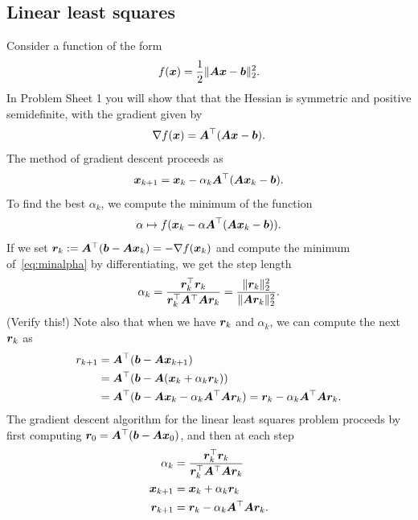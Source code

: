 \subsection{Linear least squares} Consider a function of the form
\begin{equation*}
 f(\bm{x}) = \frac{1}{2}\Vert {\bm{A}\bm{x}-\bm{b}}\Vert_2^2.
\end{equation*}
In Problem Sheet 1 you will show that that the Hessian is symmetric and positive semidefinite, with the gradient given by
\begin{equation*}
 \nabla f(\bm{x}) = \bm{A}^{\top}(\bm{A}\bm{x}-\bm{b}).
\end{equation*}
The method of gradient descent proceeds as
\begin{equation*}
 \bm{x}_{k+1} = \bm{x}_k-\alpha_k \bm{A}^{\top}(\bm{A}\bm{x}_k-\bm{b}).
\end{equation*}
To find the best $\alpha_k$, we compute the minimum of the function
\begin{equation}\label{eq:minalpha}
 \alpha \mapsto f(\bm{x}_k-\alpha \bm{A}^{\top}(\bm{A}\bm{x}_k-\bm{b})).
\end{equation}
If we set $\bm{r}_k:=\bm{A}^{\top}(\bm{b}-\bm{A}\bm{x}_k) = -\nabla f(\bm{x}_k)$ and compute the minimum of~\eqref{eq:minalpha} by differentiating, we get the step length
\begin{equation*}
 \alpha_k = \frac{\bm{r}_k^{\top}\bm{r}_k}{\bm{r}_k^{\top}\bm{A}^\top\bm{A}\bm{r}_k} = \frac{\Vert {\bm{r}_k}\Vert_2^2}{\Vert {\bm{A}\bm{r}_k}\Vert_2^2}.
\end{equation*}
(Verify this!) Note also that when we have $\bm{r}_k$ and $\alpha_k$, we can compute the next $\bm{r}_k$ as
\begin{align*}
 r_{k+1} &= \bm{A}^{\top}(\bm{b}-\bm{A}\bm{x}_{k+1})\\
         &= \bm{A}^{\top}(\bm{b}-\bm{A}(\bm{x}_{k}+\alpha_k \bm{r}_k))\\
         &= \bm{A}^{\top}(\bm{b}-\bm{A}\bm{x}_k - \alpha_k \bm{A}^{\top}\bm{A}\bm{r}_k) = \bm{r}_k - \alpha_k \bm{A}^{\top}\bm{A}\bm{r}_k.
\end{align*}
The gradient descent algorithm for the linear least squares problem proceeds by first computing $\bm{r}_0=\bm{A}^{\top}(\bm{b}-\bm{A}\bm{x}_0)$, and then at each step
\begin{align*}
 \alpha_k &= \frac{\bm{r}_k^{\top}\bm{r}_k}{\bm{r}_k^{\top}\bm{A}^\top\bm{A}\bm{r}_k}\\
 \bm{x}_{k+1} &= \bm{x}_k+\alpha_k \bm{r}_k\\
 \bm{r}_{k+1} &= \bm{r}_k - \alpha_{k}\bm{A}^{\top}\bm{A}\bm{r}_k.
\end{align*}
